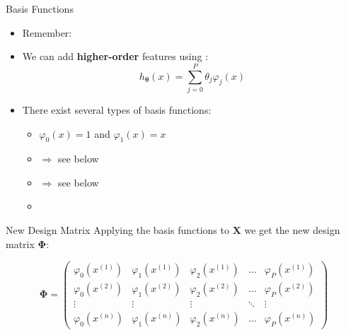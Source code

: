 \begin{frame}{Basis Functions}{}
	\begin{itemize}
		\item Remember: 
		\item We can add \textbf{higher-order} features using :
		\begin{equation}
			h_{\bm{\theta}}(x) = \sum_{j=0}^P \theta_j\varphi_j(x)
		\end{equation}
		\item There exist several types of basis functions:
		\begin{itemize}
			\item {} $\varphi_0(x) = 1$ and $\varphi_1(x) = x$
			\item {} $\Rightarrow$ see below
			\item {} $\Rightarrow$ see below
			\item {}
		\end{itemize}
	\end{itemize}
\end{frame}


\begin{frame}{New Design Matrix}{}
	Applying the basis functions to $\bm{X}$ we get the new design matrix $\bm{\Phi}$:
	
	\footnotesize
	\begin{equation}
		\bm{\Phi} =
		\begin{pmatrix}
			\varphi_0(x^{(1)}) 	& \varphi_1(x^{(1)}) 	& \varphi_2(x^{(1)}) 	& \hdots & \varphi_P(x^{(1)}) 	\\
			\varphi_0(x^{(2)}) 	& \varphi_1(x^{(2)}) 	& \varphi_2(x^{(2)}) 	& \hdots & \varphi_P(x^{(2)}) 	\\
			\vdots 				& \vdots 			& \vdots 			& \ddots & \vdots 				\\
			\varphi_0(x^{(n)}) 	& \varphi_1(x^{(n)}) 	& \varphi_2(x^{(n)}) 	& \hdots & \varphi_P(x^{(n)}) 
		\end{pmatrix}
	\end{equation}
	
	\vspace*{2mm}
	\begin{boxBlue}
		\footnotesize
	\end{boxBlue}
\end{frame}


